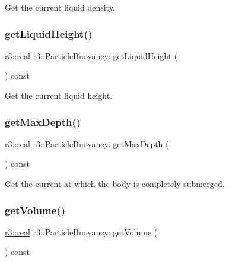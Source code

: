 Get the current liquid density. 

\mbox{\label{classr3_1_1_particle_buoyancy_ab60350b1a4fe78771b8fd1d145aa6bf1}} 
\subsubsection{\texorpdfstring{get\+Liquid\+Height()}{getLiquidHeight()}}
{\footnotesize\ttfamily \mbox{\hyperlink{namespacer3_ab2016b3e3f743fb735afce242f0dc1eb}{r3\+::real}} r3\+::\+Particle\+Buoyancy\+::get\+Liquid\+Height (\begin{DoxyParamCaption}{ }\end{DoxyParamCaption}) const}



Get the current liquid height. 

\mbox{\label{classr3_1_1_particle_buoyancy_a7f0929df70102df213722afdd511cf68}} 
\subsubsection{\texorpdfstring{get\+Max\+Depth()}{getMaxDepth()}}
{\footnotesize\ttfamily \mbox{\hyperlink{namespacer3_ab2016b3e3f743fb735afce242f0dc1eb}{r3\+::real}} r3\+::\+Particle\+Buoyancy\+::get\+Max\+Depth (\begin{DoxyParamCaption}{ }\end{DoxyParamCaption}) const}



Get the current at which the body is completely submerged. 

\mbox{\label{classr3_1_1_particle_buoyancy_a071ee55cf3413806e11445956bbcda0c}} 
\subsubsection{\texorpdfstring{get\+Volume()}{getVolume()}}
{\footnotesize\ttfamily \mbox{\hyperlink{namespacer3_ab2016b3e3f743fb735afce242f0dc1eb}{r3\+::real}} r3\+::\+Particle\+Buoyancy\+::get\+Volume (\begin{DoxyParamCaption}{ }\end{DoxyParamCaption}) const}



